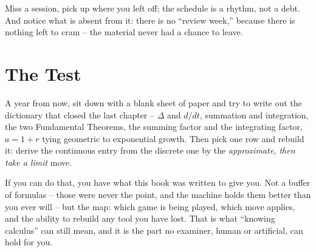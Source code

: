 \bigskip
\centerline{\vbox{}}
\bigskip

\noindent Miss a session, pick up where you left off; the schedule is a
rhythm, not a debt. And notice what is absent from it: there is no
``review week,'' because there is nothing left to cram -- the material
never had a chance to leave.

\section{The Test}
A year from now, sit down with a blank sheet of paper and try to write
out the dictionary that closed the last chapter -- $\Delta$ and
$d/dt$, summation and integration, the two Fundamental Theorems, the
summing factor and the integrating factor, $a = 1 + r$ tying geometric
to exponential growth. Then pick one row and rebuild it: derive the
continuous entry from the discrete one by the {\it approximate, then
take a limit\/} move.

If you can do that, you have what this book was written to give you.
Not a buffer of formulas -- those were never the point, and the machine
holds them better than you ever will -- but the map: which game is
being played, which move applies, and the ability to rebuild any tool
you have lost. That is what ``knowing calculus'' can still mean, and
it is the part no examiner, human or artificial, can hold for you.
